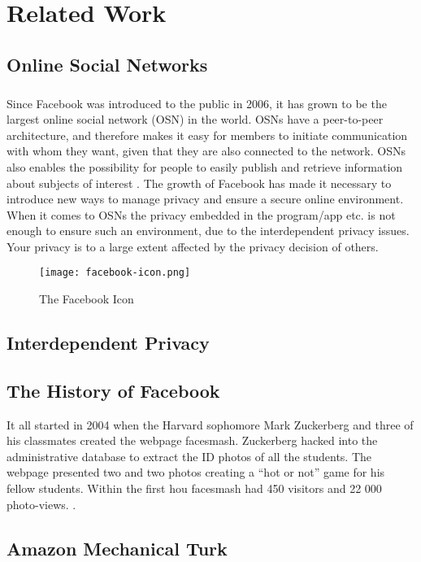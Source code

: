 \chapter{Related Work}
\label{chp:relatedwork} 


\section{Online Social Networks}
\paragraph{}

Since Facebook was introduced to the public in 2006, it has grown to be the largest online social network (OSN) in the world. OSNs have a peer-to-peer architecture, and therefore makes it easy for members to initiate communication with whom they want, given that they are also connected to the network. OSNs also enables the possibility for people to easily publish and retrieve information about subjects of interest \cite{DPBook}. The growth of Facebook has made it necessary to introduce new ways to manage privacy and ensure a secure online environment. When it comes to OSNs the privacy embedded in the program/app etc. is not enough to ensure such an environment, due to the interdependent privacy issues. Your privacy is to a large extent affected by the privacy decision of others.

\begin{figure}[h!]
\centering
\texttt{[image: facebook-icon.png]}
\caption{The Facebook Icon}
\end{figure}


\section{Interdependent Privacy}


\section{The History of Facebook}
It all started in 2004 when the Harvard sophomore Mark Zuckerberg and three of his classmates created the webpage facesmash. Zuckerberg hacked into the administrative database to extract the ID photos of all the students. The webpage presented two and two photos creating a “hot or not” game for his fellow students. Within the first hou facesmash had 450 visitors and 22 000 photo-views. \cite{FacebookHistory}.


\section{Amazon Mechanical Turk}


